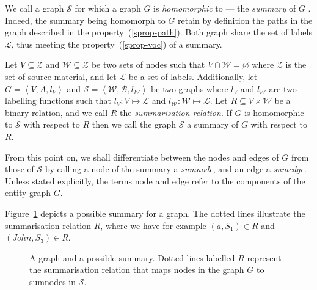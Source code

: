 We call a graph $\mathcal{S}$ for which a graph $G$ is \emph{homomorphic} to --- the \emph{summary} of $G$ \cite{campinas:2012:dexa}. Indeed, the summary being homomorph to $G$ retain by definition the paths in the graph described in the property~(\ref{sprop-path}). Both graph share the set of labels $\mathcal{L}$, thus meeting the property~(\ref{sprop-voc}) of a summary.

\begin{definition}
Let $V \subseteq \mathcal{Z}$ and $\mathcal{W} \subseteq \mathcal{Z}$ be two sets of nodes such that $V \cap \mathcal{W} = \varnothing$ where $\mathcal{Z}$ is the set of source material, and let $\mathcal{L}$ be a set of labels.
Additionally, let $G=\left\langle V, A, l_V \right\rangle$ and $\mathcal{S}=\left\langle \mathcal{W}, \mathcal{B}, l_\mathcal{W} \right\rangle$ be two graphs where $l_V$ and $l_\mathcal{W}$ are two labelling functions such that $l_V : V \mapsto \mathcal{L}$ and $l_\mathcal{W} : \mathcal{W} \mapsto \mathcal{L}$. Let $R \subseteq V \times \mathcal{W}$ be a binary relation, and we call $R$ the \emph{summarisation relation}.
If $G$ is homomorphic to $\mathcal{S}$ with respect to $R$ then we call the graph $\mathcal{S}$ a summary of $G$ with respect to $R$.
\end{definition}

\begin{remark}
From this point on, we shall differentiate between the nodes and edges of $G$ from those of $\mathcal{S}$ by calling a node of the summary a \emph{sumnode}, and an edge a \emph{sumedge}. Unless stated explicitly, the terms node and edge refer to the components of the entity graph $G$.
\end{remark}

Figure~\ref{fig:basic-summary} depicts a possible summary for a graph. The dotted lines illustrate the summarisation relation $R$, where we have for example $(a, S_1) \in R$ and $(John, S_3) \in R$.

\begin{figure}
	\centering
	\resizebox{.7\textwidth}{!}{
		
	}
	\caption{A graph and a possible summary. Dotted lines labelled $R$ represent the summarisation relation that maps nodes in the graph $G$ to sumnodes in $\mathcal{S}$.}
	\label{fig:basic-summary}
\end{figure}

